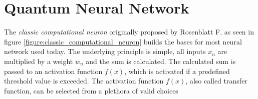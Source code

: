
\newpage

\section{Quantum Neural Network}

The \textit{classic computational neuron} originally proposed by Rosenblatt F.\cite{rosenblatt_perceptron_1958} as seen in figure \ref{figure:classic_computational_neuron} builds the bases for most neural network used today. The underlying principle is simple, all inputs $x_n$ are multiplied by a weight $w_n$ and the sum is calculated. The calculated sum is passed to an activation function $f(x)$, which is activated if a predefined threshold value is exceeded. The activation function $f(x)$, also called transfer function, can be selected from a plethora of valid choices\cite{szandala_review_2021}

